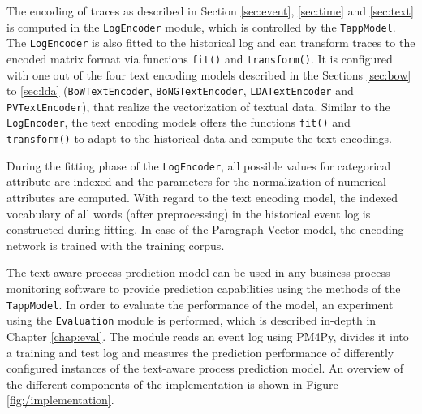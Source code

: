 The encoding of traces as described in Section \ref{sec:event}, \ref{sec:time} and \ref{sec:text} is computed in the \texttt{LogEncoder} module, which is controlled by the \texttt{TappModel}.
The \texttt{LogEncoder} is also fitted to the historical log and can transform traces to the encoded matrix format via functions \texttt{fit()} and \texttt{transform()}.
It is configured with one out of the four text encoding models described in the Sections \ref{sec:bow} to \ref{sec:lda} (\texttt{BoWTextEncoder},  \texttt{BoNGTextEncoder}, \texttt{LDATextEncoder} and  \texttt{PVTextEncoder}), that realize the vectorization of textual data.
Similar to the \texttt{LogEncoder}, the text encoding models offers the functions \texttt{fit()} and \texttt{transform()} to adapt to the historical data and compute the text encodings.

During the fitting phase of the  \texttt{LogEncoder}, all possible values for categorical attribute are indexed and the parameters for the normalization of numerical attributes are computed.
With regard to the text encoding model, the indexed vocabulary of all words (after preprocessing) in the historical event log is constructed during fitting.
In case of the Paragraph Vector model, the encoding network is trained with the training corpus.

The text-aware process prediction model can be used in any business process monitoring software to provide prediction capabilities using the methods of the \texttt{TappModel}.
In order to evaluate the performance of the model, an experiment using the \texttt{Evaluation} module is performed, which is described in-depth in Chapter \ref{chap:eval}.
The module reads an event log using PM4Py, divides it into a training and test log and measures the prediction performance of differently configured instances of the text-aware process prediction model.
An overview of the different components of the implementation is shown in Figure \ref{fig:/implementation}.